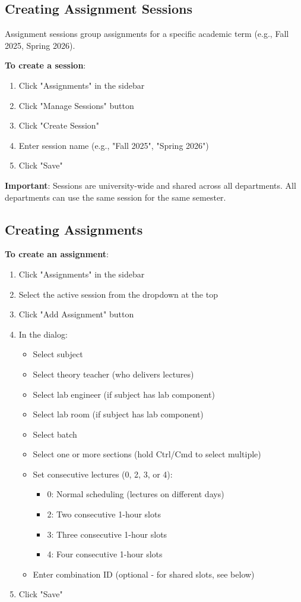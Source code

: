 \documentclass[12pt,a4paper]{article}
\begin{document}
\subsection{Creating Assignment Sessions}

Assignment sessions group assignments for a specific academic term (e.g., Fall 2025, Spring 2026).

\textbf{To create a session}:
\begin{enumerate}
\item Click "Assignments" in the sidebar
\item Click "Manage Sessions" button
\item Click "Create Session"
\item Enter session name (e.g., "Fall 2025", "Spring 2026")
\item Click "Save"
\end{enumerate}

\textbf{Important}: Sessions are university-wide and shared across all departments. All departments can use the same session for the same semester.

\subsection{Creating Assignments}

\textbf{To create an assignment}:
\begin{enumerate}
\item Click "Assignments" in the sidebar
\item Select the active session from the dropdown at the top
\item Click "Add Assignment" button
\item In the dialog:
\begin{itemize}
\item Select subject
\item Select theory teacher (who delivers lectures)
\item Select lab engineer (if subject has lab component)
\item Select lab room (if subject has lab component)
\item Select batch
\item Select one or more sections (hold Ctrl/Cmd to select multiple)
\item Set consecutive lectures (0, 2, 3, or 4):
\begin{itemize}
\item 0: Normal scheduling (lectures on different days)
\item 2: Two consecutive 1-hour slots
\item 3: Three consecutive 1-hour slots
\item 4: Four consecutive 1-hour slots
\end{itemize}
\item Enter combination ID (optional - for shared slots, see below)
\end{itemize}
\item Click "Save"
\end{enumerate}
\end{document}
